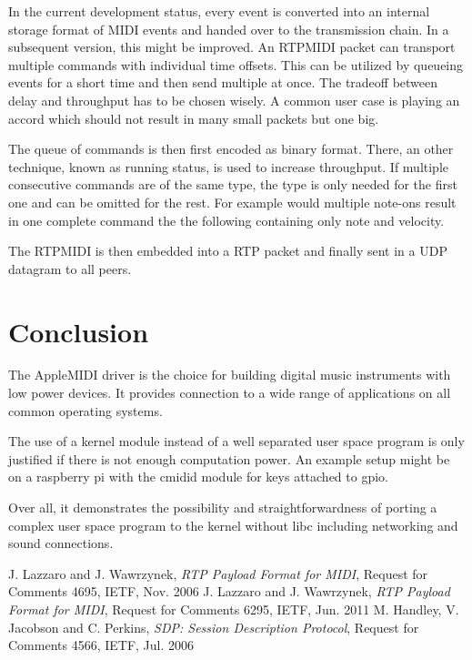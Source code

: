 \documentclass[paper=a4,fontsize=11pt,twocolumn,pagesize,bibtotoc]{scrartcl}
\begin{document}
	In the current development status, every event is converted into an internal storage format of MIDI events and handed over to the transmission chain. In a subsequent version, this might be improved. An RTPMIDI packet can transport multiple commands with individual time offsets. This can be utilized by queueing events for a short time and then send multiple at once. The tradeoff between delay and throughput has to be chosen wisely. A common user case is playing an accord which should not result in many small packets but one big.
	
	The queue of commands is then first encoded as binary format. There, an other technique, known as running status, is used to increase throughput. If multiple consecutive commands are of the same type, the type is only needed for the first one and can be omitted for the rest. For example would multiple note-ons result in one complete command the the following containing only note and velocity.
	
	The RTPMIDI is then embedded into a RTP packet and finally sent in a UDP datagram to all peers.
	
	
	\section{Conclusion}
	
	The AppleMIDI driver is the choice for building digital music instruments with low power devices. It provides connection to a wide range of applications on all common operating systems.
	
	The use of a kernel module instead of a well separated user space program is only justified if there is not enough computation power. An example setup might be on a raspberry pi with the cmidid module for keys attached to gpio.
	
	Over all, it demonstrates the possibility and straightforwardness of porting a complex user space program to the kernel without libc including networking and sound connections.
	 
	
	\begin{thebibliography}{99}
	
	
	 J. Lazzaro and J. Wawrzynek, \emph{RTP Payload Format for MIDI}, Request for Comments 4695, IETF, Nov. 2006
	 J. Lazzaro and J. Wawrzynek, \emph{RTP Payload Format for MIDI}, Request for Comments 6295, IETF, Jun. 2011
	 M. Handley, V. Jacobson and C. Perkins, \emph{SDP: Session Description Protocol}, Request for Comments 4566, IETF, Jul. 2006
	
	\end{thebibliography}
	
	
\end{document}
